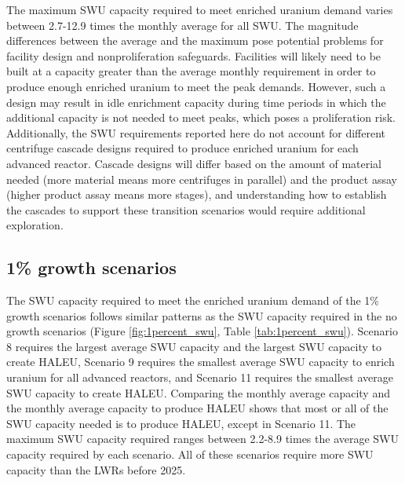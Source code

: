 The maximum \gls{SWU} capacity required to meet enriched uranium demand 
varies between 2.7-12.9 times the monthly average for all \gls{SWU}. 
The magnitude differences between the average and the maximum pose potential 
problems for facility design and nonproliferation safeguards. Facilities 
will likely need to be built at a capacity greater than the average 
monthly requirement in order to produce enough enriched uranium to meet 
the peak demands. However, such a design may result in idle enrichment 
capacity during time periods in which the additional capacity is 
not needed to meet peaks, which poses a proliferation risk. Additionally, 
the \gls{SWU} requirements reported here do not account for different 
centrifuge cascade designs required to produce enriched uranium for 
each advanced reactor. Cascade designs will differ based on 
the amount of material needed (more material means more centrifuges in 
parallel) and the product assay (higher product assay means more stages), 
and understanding how to establish the cascades to support these transition 
scenarios would require additional exploration. 

\subsection{1\% growth scenarios}
The \gls{SWU} capacity required to meet the enriched uranium demand of 
the 1\% growth scenarios 
follows similar patterns as the \gls{SWU} capacity required in the no 
growth scenarios (Figure \ref{fig:1percent_swu}, Table \ref{tab:1percent_swu}).
Scenario 8 requires the largest average \gls{SWU} 
capacity and the largest \gls{SWU} capacity to create \gls{HALEU}, Scenario 
9 requires the smallest average \gls{SWU} capacity to enrich uranium 
for all advanced reactors, and 
Scenario 11 requires the smallest average \gls{SWU} capacity 
to create \gls{HALEU}. Comparing 
the monthly average capacity and the monthly average capacity to produce \gls{HALEU} 
shows that most or all of the \gls{SWU} capacity needed is to produce 
\gls{HALEU}, except in Scenario 11. The 
maximum \gls{SWU} capacity required ranges between 2.2-8.9 times 
the average \gls{SWU} capacity required by each scenario. All of these 
scenarios require more \gls{SWU} capacity than the \glspl{LWR} before 
2025. 

